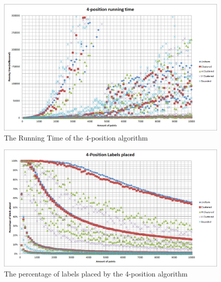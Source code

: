 \documentclass[crop=false,a4paper,oneside,11pt]{standalone}
\begin{document}
 \begin{figure}[H]
 \centering
 \centerline{\includegraphics[scale = 0.5]{4PosRunningTime.png}}
 \caption{The Running Time of the 4-position algorithm}
 \end{figure}

 \begin{figure}[H]
 \centering
  \centerline{\includegraphics[scale = 0.5]{4PosLabelsPlaced.png}}
  \caption{The percentage of labels placed by the 4-position algorithm}
 \end{figure}
\end{document}
